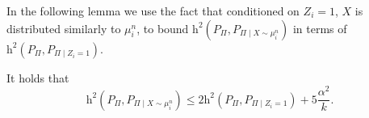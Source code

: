 \documentclass[final, 12pt]{colt2018}
\providecommand{\helli}{\mathrm{h}}
\renewcommand{\eqref}[1]{Eq.~(\ref{#1})}
\begin{document}
In the following lemma we use the fact that conditioned on $Z_i=1$, $X$ is distributed similarly to $\mu_i^n$, to bound $\helli^2\left( P_{\Pi}, P_{\Pi \mid X \sim \mu_i^n} \right)$ in terms of $\helli^2\left( P_{\Pi}, P_{\Pi \mid Z_i=1} \right)$.
\begin{lemma} \label{lem:last}
It holds that
\[ \helli^2\left( P_{\Pi}, P_{\Pi \mid X \sim \mu_i^n} \right) 
\le 2 \helli^2\left( P_{\Pi}, P_{\Pi \mid Z_i=1} \right) + 5 \frac{\alpha^2}{k}. \]
\end{lemma}
\end{document}
